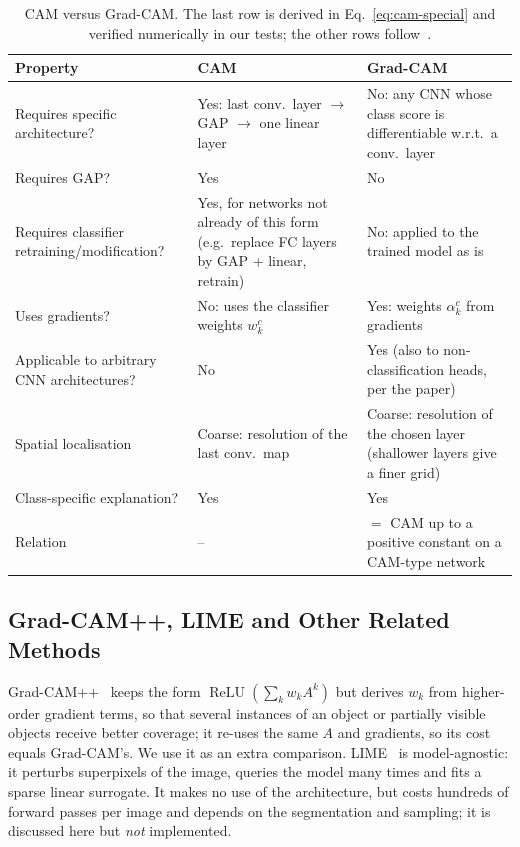 \documentclass[11pt,a4paper]{article}
\newcommand{\GC}{Grad-CAM}
\DeclareMathOperator{\ReLU}{ReLU}
\begin{document}
\begin{table}[t]\centering
\caption{CAM versus \GC. The last row is derived in Eq.~\eqref{eq:cam-special} and verified numerically in our tests; the other rows follow~\citep{zhou2016,selvaraju2017}.}\label{tab:camvsgc}
\small
\begin{tabular}{p{3.9cm}p{5.2cm}p{5.2cm}}
\toprule
Property & CAM & \GC \\ \midrule
Requires specific architecture? & Yes: last conv.\ layer $\rightarrow$ GAP $\rightarrow$ one linear layer & No: any CNN whose class score is differentiable w.r.t.\ a conv.\ layer \\
Requires GAP? & Yes & No \\
Requires classifier retraining/modification? & Yes, for networks not already of this form (e.g.\ replace FC layers by GAP + linear, retrain) & No: applied to the trained model as is \\
Uses gradients? & No: uses the classifier weights $w^c_k$ & Yes: weights $\alpha^c_k$ from gradients \\
Applicable to arbitrary CNN architectures? & No & Yes (also to non-classification heads, per the paper) \\
Spatial localisation & Coarse: resolution of the last conv.\ map & Coarse: resolution of the chosen layer (shallower layers give a finer grid) \\
Class-specific explanation? & Yes & Yes \\
Relation & -- & $=$ CAM up to a positive constant on a CAM-type network \\
\bottomrule
\end{tabular}
\end{table}

\subsection{Grad-CAM++, LIME and Other Related Methods}
Grad-CAM++~\citep{chattopadhay2018} keeps the form $\ReLU(\sum_k w_k A^k)$ but derives $w_k$ from higher-order gradient terms, so that several instances of an object or partially visible objects receive better coverage; it re-uses the same $A$ and gradients, so its cost equals \GC's. We use it as an extra comparison.
LIME~\citep{ribeiro2016} is model-agnostic: it perturbs superpixels of the image, queries the model many times and fits a sparse linear surrogate. It makes no use of the architecture, but costs hundreds of forward passes per image and depends on the segmentation and sampling; it is discussed here but \emph{not} implemented.
\end{document}
